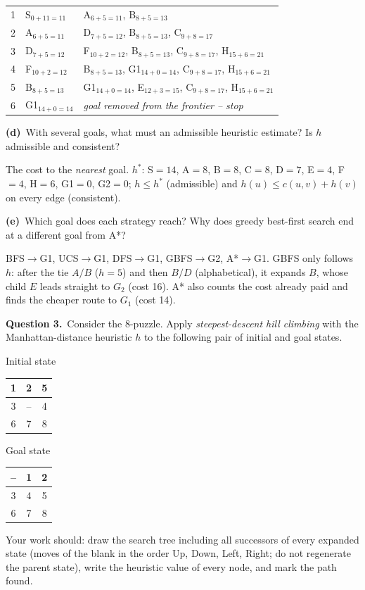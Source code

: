 \documentclass[11pt,a4paper]{article}
\newcommand{\question}[1]{\par\medskip\noindent\textbf{Question #1.}\ }
\newcommand{\subq}[1]{\par\smallskip\noindent\textbf{#1}\ }
\begin{document}
\begin{solbox}
\begin{center}
\begin{tabularx}{\linewidth}{c l >{\raggedright\arraybackslash}X}
1 & S$_{0+11=11}$ & A$_{6+5=11}$, B$_{8+5=13}$ \\
2 & A$_{6+5=11}$ & D$_{7+5=12}$, B$_{8+5=13}$, C$_{9+8=17}$ \\
3 & D$_{7+5=12}$ & F$_{10+2=12}$, B$_{8+5=13}$, C$_{9+8=17}$, H$_{15+6=21}$ \\
4 & F$_{10+2=12}$ & B$_{8+5=13}$, G1$_{14+0=14}$, C$_{9+8=17}$, H$_{15+6=21}$ \\
5 & B$_{8+5=13}$ & G1$_{14+0=14}$, E$_{12+3=15}$, C$_{9+8=17}$, H$_{15+6=21}$ \\
6 & G1$_{14+0=14}$ & \textit{goal removed from the frontier -- stop} \\
\bottomrule\end{tabularx}\end{center}
\end{solbox}
\subq{(d)}With several goals, what must an admissible heuristic estimate? Is $h$ admissible and consistent?
\begin{solbox}
The cost to the \emph{nearest} goal. $h^*$: S$=14$, A$=8$, B$=8$, C$=8$, D$=7$, E$=4$, F$=4$, H$=6$, G1$=0$, G2$=0$; $h\le h^*$ (admissible) and $h(u)\le c(u,v)+h(v)$ on every edge (consistent).
\end{solbox}
\subq{(e)}Which goal does each strategy reach? Why does greedy best-first search end at a different goal from A*?
\begin{solbox}
BFS$\to$G1, UCS$\to$G1, DFS$\to$G1, GBFS$\to$G2, A*$\to$G1. GBFS only follows $h$: after the tie $A/B$ ($h=5$) and then $B/D$ (alphabetical), it expands $B$, whose child $E$ leads straight to $G_2$ (cost 16). A* also counts the cost already paid and finds the cheaper route to $G_1$ (cost 14).
\end{solbox}
\question{3}Consider the 8-puzzle. Apply \emph{steepest-descent hill climbing} with the Manhattan-distance heuristic $h$ to the following pair of initial and goal states.\begin{center}Initial state\quad \begin{tabular}{|c|c|c|}\hline 1 & 2 & 5\\\hline 3 & -- & 4\\\hline 6 & 7 & 8\\\hline\end{tabular}\qquad\qquad Goal state\quad \begin{tabular}{|c|c|c|}\hline -- & 1 & 2\\\hline 3 & 4 & 5\\\hline 6 & 7 & 8\\\hline\end{tabular}\end{center}Your work should: draw the search tree including all successors of every expanded state (moves of the blank in the order Up, Down, Left, Right; do not regenerate the parent state), write the heuristic value of every node, and mark the path found.
\end{document}
